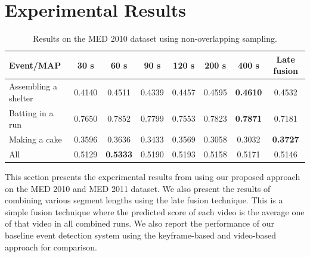 \section{Experimental Results}
\label{experimentalresult}

\begin{table}
	\renewcommand{\arraystretch}{1.3}
	\caption{Results on the MED 2010 dataset using non-overlapping sampling.}
	\label{t_med10_nonoverlapping}
	\centering
	\begin{tabular}{|l|cccccc|c|}
		\hline
		Event/MAP & 30 s & 60 s & 90 s & 120 s & 200 s & 400 s & Late fusion \\
		\hline
		Assembling a shelter&0.4140&0.4511&0.4339&0.4457&0.4595&\textbf{0.4610}&0.4532
		\\
		\hline
		Batting in a run&0.7650&0.7852&0.7799&0.7553&0.7823&\textbf{0.7871}&0.7181
		\\
		\hline
		Making a cake&0.3596&0.3636&0.3433&0.3569&0.3058&0.3032&\textbf{0.3727}
		\\
		\hline
		All&0.5129&\textbf{0.5333}&0.5190&0.5193&0.5158&0.5171&0.5146
		
		\\
		\hline
	\end{tabular}
\end{table}
This section presents the experimental results from using our proposed approach on the MED 2010 and MED 2011 dataset. We also present the results of combining various segment lengths using the late fusion technique. This is a simple fusion technique where the predicted score of each video is the average one of that video in all combined runs. We also report the performance of our baseline event detection system using the keyframe-based and video-based approach for comparison.  

